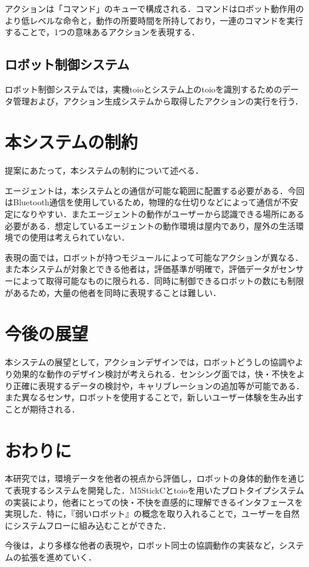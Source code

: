 \documentclass[paper=a4paper,jafontsize=9pt,head_space=15mm,gutter=20mm,
twocolumn,number_of_lines=49, line_length=26zw]{myuarticle}
\begin{document}
アクションは「コマンド」のキューで構成される．コマンドはロボット動作用のより低レベルな命令と，動作の所要時間を所持しており，一連のコマンドを実行することで，1つの意味あるアクションを表現する．

\subsection{ロボット制御システム}
ロボット制御システムでは，実機toioとシステム上のtoioを識別するためのデータ管理および，アクション生成システムから取得したアクションの実行を行う．

\section{本システムの制約}

提案にあたって，本システムの制約について述べる．

エージェントは，本システムとの通信が可能な範囲に配置する必要がある．今回はBluetooth通信を使用しているため，物理的な仕切りなどによって通信が不安定になりやすい．またエージェントの動作がユーザーから認識できる場所にある必要がある．想定しているエージェントの動作環境は屋内であり，屋外の生活環境での使用は考えられていない．

表現の面では，ロボットが持つモジュールによって可能なアクションが異なる．また本システムが対象とできる他者は，評価基準が明確で，評価データがセンサーによって取得可能なものに限られる．同時に制御できるロボットの数にも制限があるため，大量の他者を同時に表現することは難しい．

\section{今後の展望}
本システムの展望として，アクションデザインでは，ロボットどうしの協調やより効果的な動作のデザイン検討が考えられる．センシング面では，快・不快をより正確に表現するデータの検討や，キャリブレーションの追加等が可能である．また異なるセンサ，ロボットを使用することで，新しいユーザー体験を生み出すことが期待される．

\section{おわりに}
本研究では，環境データを他者の視点から評価し，ロボットの身体的動作を通じて表現するシステムを開発した．M5StickCとtoioを用いたプロトタイプシステムの実装により，他者にとっての快・不快を直感的に理解できるインタフェースを実現した．特に，『弱いロボット』の概念を取り入れることで，ユーザーを自然にシステムフローに組み込むことができた．

今後は，より多様な他者の表現や，ロボット同士の協調動作の実装など，システムの拡張を進めていく．

\renewcommand{\refname}{　参考文献}


\end{document}
